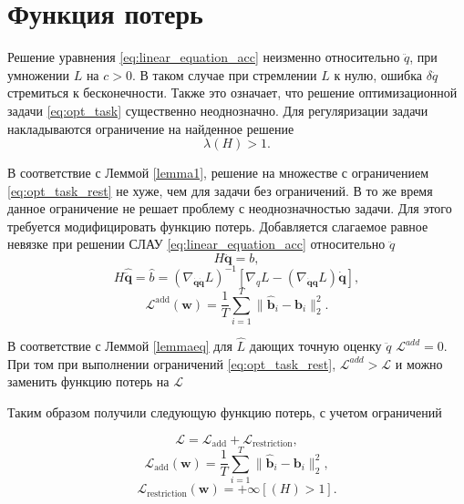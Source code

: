\documentclass[12pt, twoside]{article}
\begin{document}
\section {Функция потерь}
Решение уравнения \eqref{eq:linear_equation_acc} неизменно относительно $\ddot{q}$, при умножении $L$ на $c > 0$. В таком случае при стремлении $L$ к нулю, ошибка $\delta\ddot{q}$ стремиться к бесконечности. Также это означает, что решение оптимизационной задачи \eqref{eq:opt_task} существенно неоднозначно. Для регуляризации задачи накладываются ограничение на найденное решение
\begin{equation}\label{eq:opt_task_rest}
    \lambda \left(H\right) > 1.
\end{equation}

В соответствие с Леммой \ref{lemma1}, решение на множестве с ограничением \eqref{eq:opt_task_rest} не хуже, чем для задачи без ограничений. В то же время данное ограничение не решает проблему с неоднозначностью задачи. Для этого требуется модифицировать функцию потерь. Добавляется слагаемое равное невязке при решении СЛАУ \eqref{eq:linear_equation_acc} относительно $\ddot{q}$
\[H\ddot{\mathbf{q}} = b,\]
 \[H\hat{\ddot{\mathbf{q}}} = \hat{b} = \left(\nabla_{\dot{\mathbf{q}} \dot{\mathbf{q}}} L\right)^{-1}\left[\nabla_{q} L-\left(\nabla_{\dot{\mathbf{q}}\mathbf{q}} L\right) \dot{\mathbf{q}}\right], \]
\begin{equation}
    \mathcal{L}^{\text{add}}(\textbf{w}) = \frac{1}{T}\sum_{i=1}^{T} \| \mathbf{\hat{b}}_i - \mathbf{b}_i \|_2^2.
\end{equation}

В соответствие с Леммой \ref{lemmaeq} для $\hat{L}$ дающих точную оценку $\ddot{q}$ $\mathcal{L}^{add} = 0$. При том при выполнении ограничений \eqref{eq:opt_task_rest}, $\mathcal{L}^{add} > \mathcal{L}$ и можно заменить функцию потерь на $\mathcal{L}$

Таким образом получили следующую функцию потерь, с учетом ограничений

\begin{equation}
    \mathcal{L} = \mathcal{L}_\text{add} + \mathcal{L}_\text{restriction},
\end{equation}
\begin{equation}
    \mathcal{L}_\text{add}(\textbf{w}) = \frac{1}{T}\sum_{i=1}^{T} \| \mathbf{\hat{b}}_i - \mathbf{b}_i \|_2^2,
\end{equation}
\begin{equation}
    \mathcal{L}_\text{restriction}(\textbf{w}) = +\infty[\left(H\right) > 1].
\end{equation}
\end{document}
